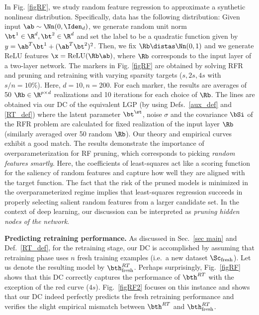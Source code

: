 In Fig. \ref{figRF}, we study random feature regression to approximate a synthetic nonlinear distribution. Specifically, data has the following distribution: Given input $\ab\sim\Nn(0,\Iden_d)$, we generate random unit norm $\bt^1\in\R^d,\bt^2\in\R^d$ and set the label to be a quadratic function given by $y=\ab^T\bt^1+(\ab^T\bt^2)^2$. Then, we fix $\Rb\distas\Nn(0,1)$ and we generate ReLU features $\x=\text{ReLU}(\Rb\ab)$, where $\Rb$ corresponds to the input layer of a two-layer network. The markers in Fig. \ref{figRF} are obtained by solving RFR and pruning and retraining with varying sparsity targets ($s,2s,4s$ with $s/n=10\%$). Here, $d=10, n=200$. For each marker, the results are averages of 50 $\Rb\in\R^{p\times d}$ realizations and 10 iterations for each choice of $\Rb$. The lines are obtained via our DC of the equivalent LGP (by using Defs.~\ref{aux_def} and \ref{RT_def}) where the latent parameter $\bt^\st$, noise $\sigma$ and the covariance $\bSi$ of the RFR problem are calculated for fixed realization of the input layer $\Rb$ (similarly averaged over 50 random $\Rb$). Our theory and empirical curves exhibit a good match. The results demonstrate the importance of overparameterization for RF pruning, which corresponds to picking {\em{random features smartly}}. Here, the coefficients of least-squares act like a scoring function for the saliency of random features and capture how well they are aligned with the target function. The fact that the risk of the pruned models is minimized in the overparameterized regime implies that least-squares regression succeeds in properly selecting salient random features from a larger candidate set. In the context of deep learning, our discussion can be interpreted as {\em{pruning hidden nodes of the network}}.

\noindent\textbf{Predicting retraining performance.} As discussed in Sec.~\ref{sec main} and Def.~\ref{RT_def}, for the retraining stage, our DC is accomplished by assuming that retraining phase uses $n$ fresh training examples (i.e.~a new dataset $\Sc_{\text{fresh}}$). Let us denote the resulting model by $\bth^{RT}_{\text{fresh}}$. Perhaps surprisingly, Fig.~\ref{figRF} shows that this DC correctly captures the performance of $\bth^{RT}$ with the exception of the red curve ($4s$). Fig.~\ref{figRF2} focuses on this instance and shows that our DC indeed perfectly predicts the fresh retraining performance and verifies the slight empirical mismatch between $\bth^{RT}$ and $\bth^{RT}_{\text{fresh}}$.
\vspace{-6pt}
